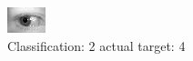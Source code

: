\begin{figure}[h!]
\begin{center}
\includegraphics[width=0.60\columnwidth]{figures/ID711_class_2_target_4.png}
\end{center}
\caption{ Classification: 2 actual target: 4}
\label{fig:ID711_class_2_target_4}
\end{figure}
